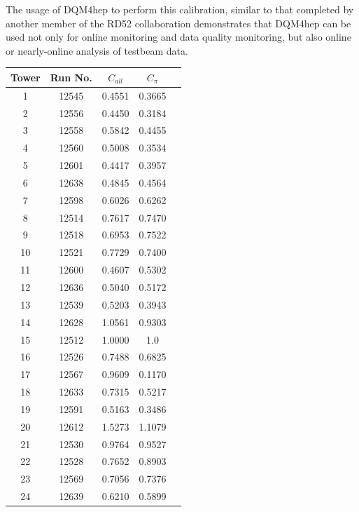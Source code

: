 
The usage of \acrshort{DQM4hep} to perform this calibration, similar to that completed by another member of the RD52 collaboration \cite{idea-equalisation} demonstrates that DQM4hep can be used not only for online monitoring and data quality monitoring, but also online or nearly-online analysis of testbeam data.

\begin{table}[hp]
\centering
	\begin{tabular}{ c c c c c}
	\hline \hline
	\textbf{Tower} & \textbf{Run No.} & $C_{all}$ & $C_{\pi}$ \\ \hline
	 1 & 12545 & 0.4551 & 0.3665 \\
	 2 & 12556 & 0.4450 & 0.3184 \\
	 3 & 12558 & 0.5842 & 0.4455 \\
	 4 & 12560 & 0.5008 & 0.3534 \\
	 5 & 12601 & 0.4417 & 0.3957 \\
	 6 & 12638 & 0.4845 & 0.4564 \\
	 7 & 12598 & 0.6026 & 0.6262 \\
	 8 & 12514 & 0.7617 & 0.7470 \\
	 9 & 12518 & 0.6953 & 0.7522 \\
	10 & 12521 & 0.7729 & 0.7400 \\
	11 & 12600 & 0.4607 & 0.5302 \\
	12 & 12636 & 0.5040 & 0.5172 \\
	13 & 12539 & 0.5203 & 0.3943 \\
	14 & 12628 & 1.0561 & 0.9303 \\
	15 & 12512 & 1.0000 & 1.0 \\
	16 & 12526 & 0.7488 & 0.6825 \\
	17 & 12567 & 0.9609 & 0.1170 \\
	18 & 12633 & 0.7315 & 0.5217 \\
	19 & 12591 & 0.5163 & 0.3486 \\
	20 & 12612 & 1.5273 & 1.1079 \\
	21 & 12530 & 0.9764 & 0.9527 \\
	22 & 12528 & 0.7652 & 0.8903 \\
	23 & 12569 & 0.7056 & 0.7376 \\
	24 & 12639 & 0.6210 & 0.5899 \\

\end{tabular}
\end{table}
